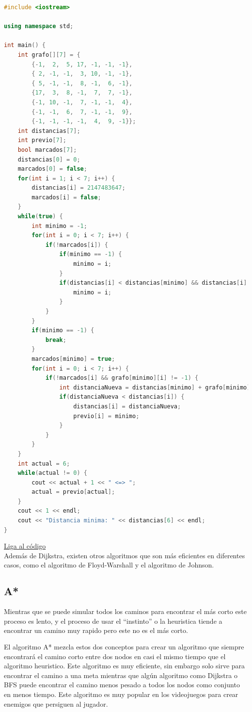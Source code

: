 \documentclass{article}
\begin{document}
\begin{lstlisting}[language=C++, title=Algoritmo de Dijkstra]
#include <iostream>

using namespace std;

int main() {
	int grafo[][7] = {
		{-1,  2,  5, 17, -1, -1, -1},
		{ 2, -1, -1,  3, 10, -1, -1},
		{ 5, -1, -1,  8, -1,  6, -1},
		{17,  3,  8, -1,  7,  7, -1},
		{-1, 10, -1,  7, -1, -1,  4},
		{-1, -1,  6,  7, -1, -1,  9},
		{-1, -1, -1, -1,  4,  9, -1}};
	int distancias[7];
	int previo[7];
	bool marcados[7];
	distancias[0] = 0;
	marcados[0] = false;
	for(int i = 1; i < 7; i++) {
		distancias[i] = 2147483647;
		marcados[i] = false;
	}
	while(true) {
		int minimo = -1;
		for(int i = 0; i < 7; i++) {
			if(!marcados[i]) {
				if(minimo == -1) {
					minimo = i;
				}
				if(distancias[i] < distancias[minimo] && distancias[i] != 2147483647) {
					minimo = i;
				}
			}
		}
		if(minimo == -1) {
			break;
		}
		marcados[minimo] = true;
		for(int i = 0; i < 7; i++) {
			if(!marcados[i] && grafo[minimo][i] != -1) {
				int distanciaNueva = distancias[minimo] + grafo[minimo][i];
				if(distanciaNueva < distancias[i]) {
					distancias[i] = distanciaNueva;
					previo[i] = minimo;
				}
			}
		}
	}
	int actual = 6;
	while(actual != 0) {
		cout << actual + 1 << " <=> ";
		actual = previo[actual];
	}
	cout << 1 << endl;
	cout << "Distancia minima: " << distancias[6] << endl;
}
\end{lstlisting}
\href{https://repl.it/@Jamesscn/Algoritmo-de-Dijkstra}{Liga al código} \\

Además de Dijkstra, existen otros algoritmos que son más eficientes en diferentes casos, como el algoritmo de Floyd-Warshall y el algoritmo de Johnson.

\subsection{A*}

Mientras que se puede simular todos los caminos para encontrar el más corto este proceso es lento, y el proceso de usar el ``instinto'' o la heuristica tiende a encontrar un camino muy rapido pero este no es el más corto.

El algoritmo A* mezcla estos dos conceptos para crear un algoritmo que siempre encontrará el camino corto entre dos nodos en casi el mismo tiempo que el algoritmo heuristico. Este algoritmo es muy eficiente, sin embargo solo sirve para encontrar el camino a una meta mientras que algún algoritmo como Dijkstra o BFS puede encontrar el camino menos pesado a todos los nodos como conjunto en menos tiempo. Este algoritmo es muy popular en los videojuegos para crear enemigos que persiguen al jugador.
\end{document}
